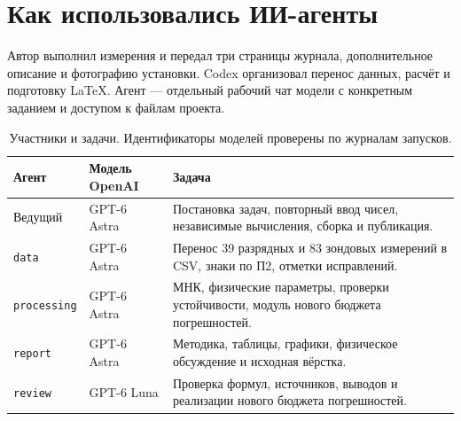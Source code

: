\section*{Как использовались ИИ-агенты}
Автор выполнил измерения и передал три страницы журнала, дополнительное
описание и фотографию установки. Codex организовал перенос данных,
расчёт и подготовку LaTeX. Агент --- отдельный рабочий чат модели
с конкретным заданием и доступом к файлам проекта.

\begin{center}
\end{center}

\begin{table}[h!]\centering\small
\caption{Участники и задачи. Идентификаторы моделей проверены по журналам запусков.}
\begin{tabular}{p{2.3cm}p{3cm}p{9cm}}
\hline
Агент & Модель OpenAI & Задача\\ \hline
Ведущий & GPT-6 Astra & Постановка задач, повторный ввод чисел, независимые вычисления, сборка и публикация.\\
\texttt{data} & GPT-6 Astra & Перенос 39 разрядных и 83 зондовых измерений в CSV, знаки по П2, отметки исправлений.\\
\texttt{processing} & GPT-6 Astra & МНК, физические параметры, проверки устойчивости, модуль нового бюджета погрешностей.\\
\texttt{report} & GPT-6 Astra & Методика, таблицы, графики, физическое обсуждение и исходная вёрстка.\\
\texttt{review} & GPT-6 Luna & Проверка формул, источников, выводов и реализации нового бюджета погрешностей.\\ \hline
\end{tabular}
\end{table}

